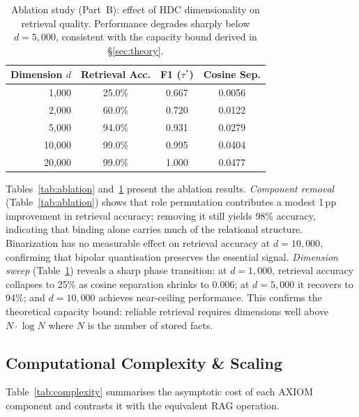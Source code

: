 \documentclass[11pt,a4paper]{article}
\begin{document}
\begin{table}[t]
    \centering
    \caption{Ablation study (Part~B): effect of HDC dimensionality on
    retrieval quality.  Performance degrades sharply below $d = 5{,}000$,
    consistent with the capacity bound derived in \S\ref{sec:theory}.}
    \label{tab:dim_ablation}
    \begin{tabular}{@{}rccc@{}}
        \toprule
        \textbf{Dimension $d$} & \textbf{Retrieval Acc.}
        & \textbf{F1 ($\tau^{*}$)} & \textbf{Cosine Sep.} \\
        \midrule
         1{,}000 & 25.0\%  & 0.667  & 0.0056 \\
         2{,}000 & 60.0\%  & 0.720  & 0.0122 \\
         5{,}000 & 94.0\%  & 0.931  & 0.0279 \\
        10{,}000 & 99.0\%  & 0.995  & 0.0404 \\
        20{,}000 & 99.0\%  & 1.000  & 0.0477 \\
        \bottomrule
    \end{tabular}
\end{table}

Tables~\ref{tab:ablation} and~\ref{tab:dim_ablation} present the
ablation results.  \emph{Component removal} (Table~\ref{tab:ablation})
shows that role permutation contributes a modest 1\,pp improvement in
retrieval accuracy; removing it still yields 98\% accuracy, indicating
that binding alone carries much of the relational structure.
Binarization has no measurable effect on retrieval accuracy at
$d = 10{,}000$, confirming that bipolar quantisation preserves the
essential signal.  \emph{Dimension sweep} (Table~\ref{tab:dim_ablation})
reveals a sharp phase transition: at $d = 1{,}000$, retrieval accuracy
collapses to 25\% as cosine separation shrinks to 0.006; at
$d = 5{,}000$ it recovers to 94\%; and $d = 10{,}000$ achieves
near-ceiling performance.  This confirms the theoretical capacity
bound: reliable retrieval requires dimensions well above
$N \cdot \log N$ where $N$ is the number of stored facts.

\subsection{Computational Complexity \& Scaling}
\label{sec:complexity}

Table~\ref{tab:complexity} summarises the asymptotic cost of each
AXIOM component and contrasts it with the equivalent RAG operation.
\end{document}

